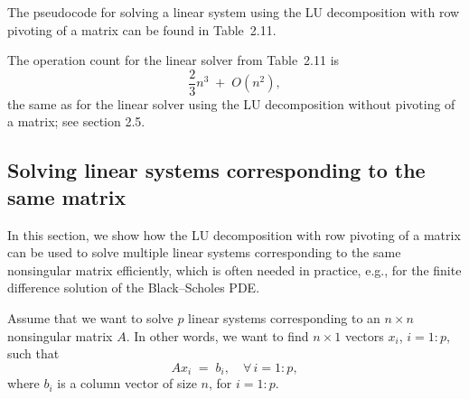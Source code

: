 The pseudocode for solving a linear system using the LU decomposition with
row pivoting of a matrix can be found in Table~2.11.

The operation count for the linear solver from Table~2.11 is
\[
\frac{2}{3}n^3 \;+\; O(n^2),
\]
the same as for the linear solver using the LU decomposition without
pivoting of a matrix; see section 2.5.

\subsection{Solving linear systems corresponding to the same matrix}

In this section, we show how the LU decomposition with row pivoting of a
matrix can be used to solve multiple linear systems corresponding to the
same nonsingular
matrix efficiently, which is often needed in practice, e.g., for the finite
difference solution of the Black--Scholes PDE.

\begin{table}[H]
\centering
\caption{Linear solver using LU decomposition with row pivoting}
\end{table}

Assume that we want to solve $p$ linear systems corresponding to an
$n\times n$ nonsingular matrix $A$. In other words, we want to find
$n\times 1$ vectors $x_i$, $i=1:p$, such that
\begin{equation}
Ax_i \;=\; b_i, \quad \forall\, i=1:p,
\end{equation}
where $b_i$ is a column vector of size $n$, for $i=1:p$.

